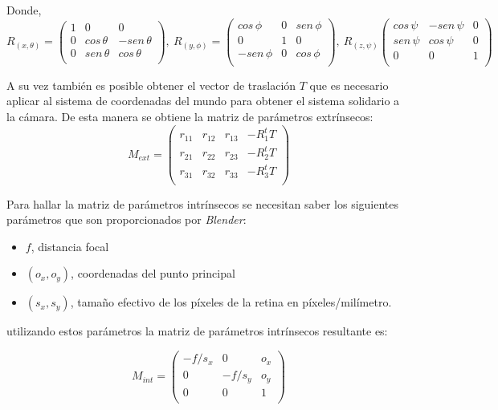  Donde,
 \[R_{(x,\theta)} = \begin{pmatrix}
		1 &   0         &  0\\
		0 & cos\,\theta & -sen\,\theta\\
		0 & sen\,\theta & cos\,\theta\\ 
\end{pmatrix}, ~
R_{(y,\phi)}=\begin{pmatrix}
		cos\,\phi  & 0 & sen\,\phi\\
		0          & 1 & 0\\
		-sen\,\phi &0  & cos\,\phi\\ 
\end{pmatrix}, ~
R_{(z,\psi)}\begin{pmatrix}
		cos\,\psi & -sen\,\psi & 0\\
		sen\,\psi & cos\,\psi  & 0\\
		 0          & 0            & 1\\ 
\end{pmatrix}\]

A su vez también es posible obtener el vector de traslación $T$ que es necesario aplicar al sistema de coordenadas del mundo para obtener el sistema solidario a la cámara. De esta manera se obtiene la matriz de parámetros extrínsecos:
\[
		M_{ext}=\begin{pmatrix}
			r_{11} & r_{12} & r_{13} &-R^t_1 T\\
			r_{21} & r_{22} & r_{23} &-R^t_2 T\\
			r_{31} & r_{32} & r_{33} &-R^t_3 T\\
		\end{pmatrix}
\] 

Para hallar la matriz de parámetros intrínsecos se necesitan saber los siguientes parámetros que son proporcionados por \emph{Blender}: 
\begin{itemize}
\item $f$, distancia focal
\item $(o_x, o_y)$, coordenadas del punto principal
\item $(s_x,s_y)$, tamaño efectivo de los píxeles de la retina en píxeles/milímetro.
\end{itemize}

utilizando estos parámetros la matriz de parámetros intrínsecos resultante es:

\[M_{int}=\begin{pmatrix}
			-f/s_x & 0      & o_x\\
			0      & -f/s_y & o_y\\
			0      & 0      & 1\\
		\end{pmatrix} \]
 
